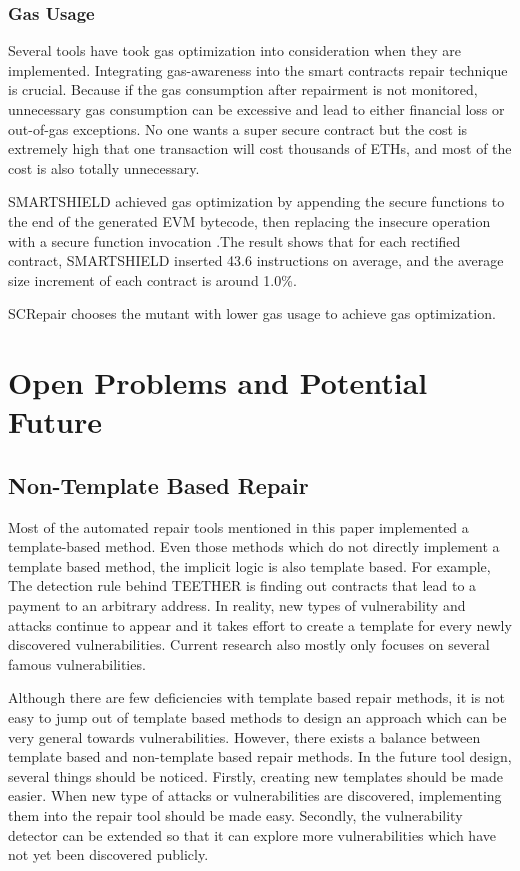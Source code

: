 \documentclass[sigplan,screen]{acmart}
\begin{document}
\subsubsection{Gas Usage}

Several tools have took gas optimization into consideration when they are implemented\cite{yu2020smart}\cite{zhang2020smartshield}. Integrating gas-awareness into the smart contracts repair technique is crucial. Because if the gas consumption after repairment is not monitored, unnecessary gas consumption can be excessive and lead to either financial loss or out-of-gas exceptions. No one wants a super secure contract but the cost is extremely high that one transaction will cost thousands of ETHs, and most of the cost is also totally unnecessary. 

SMARTSHIELD achieved gas optimization by appending the secure functions to the end of the generated EVM bytecode, then replacing the insecure operation with a secure function invocation .The result shows that for each rectified contract, SMARTSHIELD inserted 43.6 instructions on average, and the average size increment of each contract is around 1.0\%.

SCRepair chooses the mutant with lower gas usage to achieve gas optimization.

\section{Open Problems and Potential Future}
\subsection{Non-Template Based Repair}

Most of the automated repair tools mentioned in this paper implemented a template-based method. Even those methods which do not directly implement a template based method, the implicit logic is also template based. For example, The detection rule behind TEETHER is finding out contracts that lead to a payment to an arbitrary address. In reality, new types of vulnerability and attacks continue to appear and it takes effort to create a template for every newly discovered vulnerabilities. Current research also mostly only focuses on several famous vulnerabilities.

Although there are few deficiencies with template based repair methods, it is not easy to jump out of template based methods to design an approach which can be very general towards vulnerabilities.
However, there exists a balance between template based and non-template based repair methods. In the future tool design, several things should be noticed. Firstly, creating new templates should be made easier. When new type of attacks or vulnerabilities are discovered, implementing them into the repair tool should be made easy. Secondly, the vulnerability detector can be extended so that it can explore more vulnerabilities which have not yet been discovered publicly.
\end{document}
